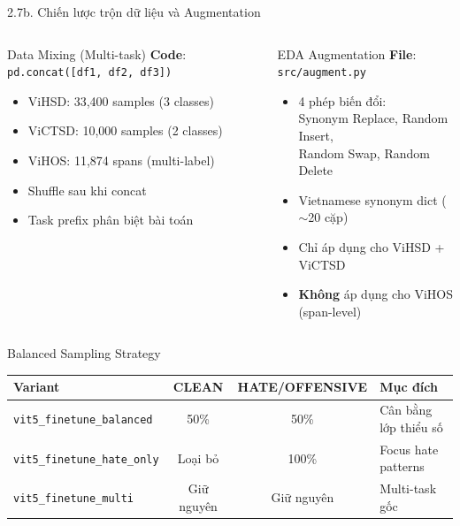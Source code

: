 \documentclass[11pt, aspectratio=169]{beamer}
\begin{document}
\begin{frame}[shrink=8]{2.7b. Chiến lược trộn dữ liệu và Augmentation}

\begin{columns}[T]
  \begin{block}{Data Mixing (Multi-task)}
    \textbf{Code}: \texttt{pd.concat([df1, df2, df3])}
    \begin{itemize}
      \item ViHSD: 33,400 samples (3 classes)
      \item ViCTSD: 10,000 samples (2 classes)
      \item ViHOS: 11,874 spans (multi-label)
      \item Shuffle sau khi concat
      \item Task prefix phân biệt bài toán
    \end{itemize}
  \end{block}

  \begin{block}{EDA Augmentation}
    \textbf{File}: \texttt{src/augment.py}
    \begin{itemize}
      \item 4 phép biến đổi:\\
        Synonym Replace, Random Insert,\\
        Random Swap, Random Delete
      \item Vietnamese synonym dict ($\sim$20 cặp)
      \item Chỉ áp dụng cho ViHSD + ViCTSD
      \item \textbf{Không} áp dụng cho ViHOS (span-level)
    \end{itemize}
  \end{block}
\end{columns}

\vspace{0.3cm}
\begin{block}{Balanced Sampling Strategy}
  \centering
  \begin{tabular}{lccl}
    \toprule
    \textbf{Variant} & \textbf{CLEAN} & \textbf{HATE/OFFENSIVE} & \textbf{Mục đích} \\
    \midrule
    \texttt{vit5\_finetune\_balanced} & 50\% & 50\% & Cân bằng lớp thiểu số \\
    \texttt{vit5\_finetune\_hate\_only} & Loại bỏ & 100\% & Focus hate patterns \\
    \texttt{vit5\_finetune\_multi} & Giữ nguyên & Giữ nguyên & Multi-task gốc \\
    \bottomrule
  \end{tabular}
\end{block}
\end{frame}
\end{document}
